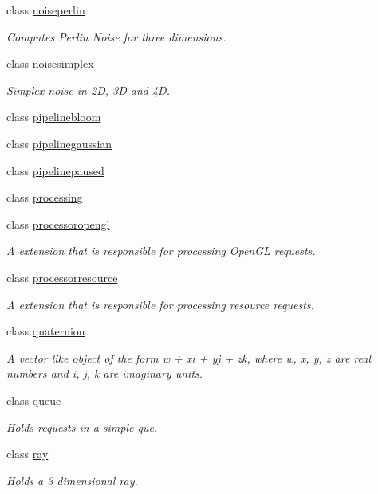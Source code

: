 \begin{DoxyCompactItemize}
class \hyperlink{classflounder_1_1noiseperlin}{noiseperlin}
\begin{DoxyCompactList}\small\item\em Computes Perlin Noise for three dimensions. \end{DoxyCompactList}\item 
class \hyperlink{classflounder_1_1noisesimplex}{noisesimplex}
\begin{DoxyCompactList}\small\item\em Simplex noise in 2D, 3D and 4D. \end{DoxyCompactList}\item 
class \hyperlink{classflounder_1_1pipelinebloom}{pipelinebloom}
\item 
class \hyperlink{classflounder_1_1pipelinegaussian}{pipelinegaussian}
\item 
class \hyperlink{classflounder_1_1pipelinepaused}{pipelinepaused}
\item 
class \hyperlink{classflounder_1_1processing}{processing}
\item 
class \hyperlink{classflounder_1_1processoropengl}{processoropengl}
\begin{DoxyCompactList}\small\item\em A extension that is responsible for processing Open\+GL requests. \end{DoxyCompactList}\item 
class \hyperlink{classflounder_1_1processorresource}{processorresource}
\begin{DoxyCompactList}\small\item\em A extension that is responsible for processing resource requests. \end{DoxyCompactList}\item 
class \hyperlink{classflounder_1_1quaternion}{quaternion}
\begin{DoxyCompactList}\small\item\em A vector like object of the form w + xi + yj + zk, where w, x, y, z are real numbers and i, j, k are imaginary units. \end{DoxyCompactList}\item 
class \hyperlink{classflounder_1_1queue}{queue}
\begin{DoxyCompactList}\small\item\em Holds requests in a simple que. \end{DoxyCompactList}\item 
class \hyperlink{classflounder_1_1ray}{ray}
\begin{DoxyCompactList}\small\item\em Holds a 3 dimensional ray. \end{DoxyCompactList}\item 

\end{DoxyCompactItemize}
